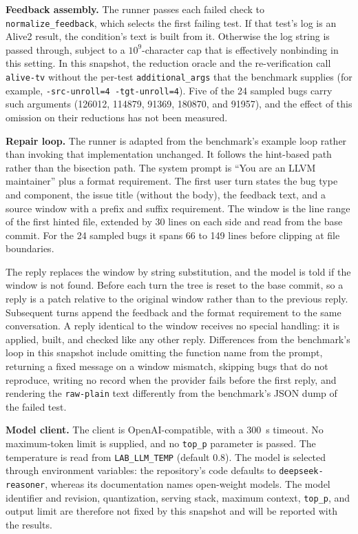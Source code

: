 \documentclass[conference]{IEEEtran}
\newcommand{\cn}[1]{\texttt{#1}}   %
\begin{document}
\textbf{Feedback assembly.} The runner passes each failed check to \texttt{normalize\_feedback}, which selects the first failing test. If that test's log is an Alive2 result, the condition's text is built from it. Otherwise the log string is passed through, subject to a $10^9$-character cap that is effectively nonbinding in this setting. In this snapshot, the reduction oracle and the re-verification call \texttt{alive-tv} without the per-test \texttt{additional\_args} that the benchmark supplies (for example, \texttt{-src-unroll=4 -tgt-unroll=4}). Five of the 24 sampled bugs carry such arguments (126012, 114879, 91369, 180870, and 91957), and the effect of this omission on their reductions has not been measured.

\textbf{Repair loop.} The runner is adapted from the benchmark's example loop rather than invoking that implementation unchanged. It follows the hint-based path rather than the bisection path. The system prompt is ``You are an LLVM maintainer'' plus a format requirement. The first user turn states the bug type and component, the issue title (without the body), the feedback text, and a source window with a prefix and suffix requirement. The window is the line range of the first hinted file, extended by 30 lines on each side and read from the base commit. For the 24 sampled bugs it spans 66 to 149 lines before clipping at file boundaries.

The reply replaces the window by string substitution, and the model is told if the window is not found. Before each turn the tree is reset to the base commit, so a reply is a patch relative to the original window rather than to the previous reply. Subsequent turns append the feedback and the format requirement to the same conversation. A reply identical to the window receives no special handling: it is applied, built, and checked like any other reply. Differences from the benchmark's loop in this snapshot include omitting the function name from the prompt, returning a fixed message on a window mismatch, skipping bugs that do not reproduce, writing no record when the provider fails before the first reply, and rendering the \cn{raw-plain} text differently from the benchmark's JSON dump of the failed test.

\textbf{Model client.} The client is OpenAI-compatible, with a 300~s timeout. No maximum-token limit is supplied, and no \texttt{top\_p} parameter is passed. The temperature is read from \texttt{LAB\_LLM\_TEMP} (default 0.8). The model is selected through environment variables: the repository's code defaults to \texttt{deepseek-reasoner}, whereas its documentation names open-weight models. The model identifier and revision, quantization, serving stack, maximum context, \texttt{top\_p}, and output limit are therefore not fixed by this snapshot and will be reported with the results.
\end{document}
